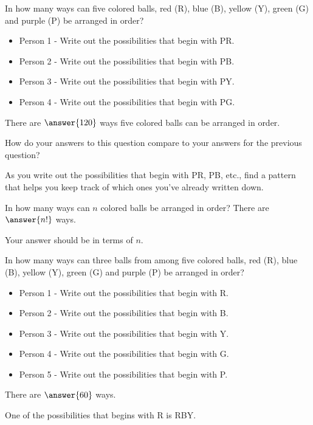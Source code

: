 \documentclass[number]{ximera}
\begin{document}
\begin{question}
In how many ways can five colored balls, red (R), blue (B), yellow (Y), green (G) and purple (P) be arranged in order?
\begin{itemize}
\item Person 1 - Write out the possibilities that begin with PR.
\item Person 2 - Write out the possibilities that begin with PB.
\item Person 3 - Write out the possibilities that begin with PY.
\item Person 4 - Write out the possibilities that begin with PG.
\end{itemize}
There are $\answer{120}$ ways five colored balls can be arranged in order.
\begin{hint}
How do your answers to this question compare to your answers for the previous question?
\end{hint}
\begin{hint}
As you write out the possibilities that begin with PR, PB, etc., find a pattern that helps you keep track of which ones you've already written down.
\end{hint}
\end{question}

\begin{question}
In how many ways can $n$ colored balls be arranged in order? There are $\answer{n!}$ ways.
\begin{hint}
Your answer should be in terms of $n$.
\end{hint}
\end{question}

\begin{question}
In how many ways can three balls from among five colored balls, red (R), blue (B), yellow (Y), green (G) and purple (P) be arranged in order?
\begin{itemize}
\item Person 1 - Write out the possibilities that begin with R.
\item Person 2 - Write out the possibilities that begin with B.
\item Person 3 - Write out the possibilities that begin with Y.
\item Person 4 - Write out the possibilities that begin with G.
\item Person 5 - Write out the possibilities that begin with P.
\end{itemize}
There are $\answer{60}$ ways.
\begin{hint}
One of the possibilities that begins with R is RBY.
\end{hint}
\end{question}
\end{document}
